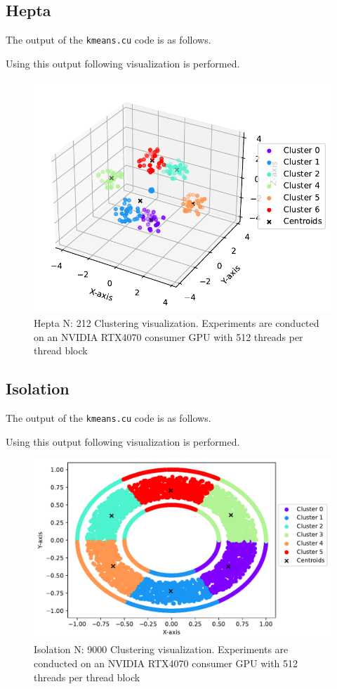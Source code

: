 \subsection{Hepta}
The output of the \texttt{kmeans.cu} code is as follows.


Using this output following visualization is performed.
\begin{figure}[H]
    \centering
    \includegraphics[width=.8\textwidth]{figures/plots/hepta.pdf}
    \caption{Hepta N: 212 Clustering visualization. Experiments are conducted on an NVIDIA RTX4070 consumer GPU with 512 threads per thread block}
    \label{hepta}
\end{figure}

\subsection{Isolation}
The output of the \texttt{kmeans.cu} code is as follows.


Using this output following visualization is performed.
\begin{figure}[H]
    \centering
    \includegraphics[width=.8\textwidth]{figures/plots/isolation.pdf}
    \caption{Isolation N: 9000 Clustering visualization. Experiments are conducted on an NVIDIA RTX4070 consumer GPU with 512 threads per thread block}
    \label{isolation}
\end{figure}

